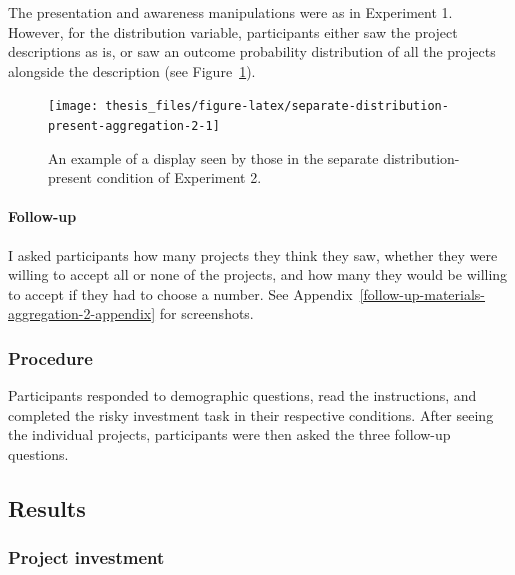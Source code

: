\documentclass[a4paper, nobind, dvipsnames]{templates/ociamthesis}
\theoremstyle{definition}
\theoremstyle{definition}
\theoremstyle{definition}
\theoremstyle{definition}
\theoremstyle{remark}
\begin{document}
The presentation and awareness manipulations were as in Experiment 1. However,
for the distribution variable, participants either saw the project descriptions
as is, or saw an outcome probability distribution of all the projects alongside
the description (see
Figure~\ref{fig:separate-distribution-present-aggregation-2}).



\begin{figure}
\texttt{[image: thesis\_files/figure-latex/separate-distribution-present-aggregation-2-1]} \caption{An example of a display seen by those in the separate distribution-present condition of Experiment 2.}\label{fig:separate-distribution-present-aggregation-2}
\end{figure}

\hypertarget{follow-up-aggregation-2}{%
\paragraph{Follow-up}\label{follow-up-aggregation-2}}

I asked participants how many projects they think they saw, whether they were
willing to accept all or none of the projects, and how many they would
be willing to accept if they had to choose a number. See
Appendix~\ref{follow-up-materials-aggregation-2-appendix} for screenshots.

\hypertarget{procedure-1}{%
\subsubsection{Procedure}\label{procedure-1}}

Participants responded to demographic questions, read the instructions, and
completed the risky investment task in their respective conditions. After seeing
the individual projects, participants were then asked the three follow-up
questions.

\hypertarget{results-aggregation-2}{%
\subsection{Results}\label{results-aggregation-2}}

\hypertarget{project-investment}{%
\subsubsection{Project investment}\label{project-investment}}
\end{document}
